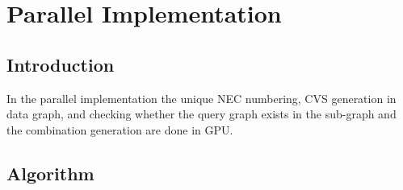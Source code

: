 \chapter{Parallel Implementation}
 \label{chap:pi}
 \section{Introduction}
\hspace{10mm}In the parallel implementation the unique NEC numbering, CVS generation in data graph, and checking whether the query graph exists in the sub-graph and the combination generation are done in GPU.

\section{Algorithm}
 \label{sec:al}
 
